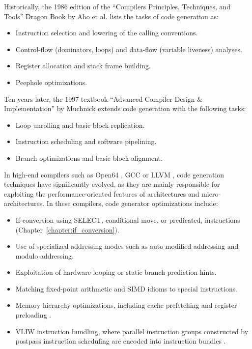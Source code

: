 Historically, the 1986 edition of the ``Compilers Principles, Techniques, and
Tools'' Dragon Book by Aho et al. \cite{Aho:1986:Book} lists the tasks of code generation as:
\begin{itemize}
\item Instruction selection and lowering of the calling conventions.
\item Control-flow (dominators, loops) and data-flow (variable liveness) analyses.
\item Register allocation and stack frame building.
\item Peephole optimizations.
\end{itemize}
Ten years later, the 1997 textbook ``Advanced Compiler Design \& Implementation''
by Muchnick \cite{Muchnick:1997:Book} extends code generation with the following tasks: \begin{itemize}
\item Loop unrolling and basic block replication.
\item Instruction scheduling and software pipelining.
\item Branch optimizations and basic block alignment.
\end{itemize}
In high-end compilers such as Open64
\cite{Chan:2008:Tutorial,Chapman:2013:IJPP}, GCC \cite{Stallman:2017:GCC} or
LLVM \cite{Lattner:2004:CGO}, code generation techniques have significantly evolved, as they are mainly responsible
for exploiting the performance-oriented features of architectures and
micro-architectures. In these compilers, code generator optimizations include:
\begin{itemize}
\item If-conversion using SELECT, conditional move, or predicated, instructions (Chapter~\ref{chapter:if_conversion}).
\item Use of specialized addressing modes such as auto-modified addressing \cite{Lee:2003:TODAES} and modulo
addressing.
\item Exploitation of hardware looping \cite{Leupers:1997:Book} or static branch prediction hints.
\item Matching fixed-point arithmetic and SIMD idioms to special instructions.
\item Memory hierarchy optimizations, including cache prefetching and register preloading \cite{Dinechin:1999:CC}.
\item VLIW instruction bundling, where parallel instruction groups constructed by postpass
instruction scheduling are encoded into instruction bundles \cite{Kaestner:2001:LCTES}.
\end{itemize}

